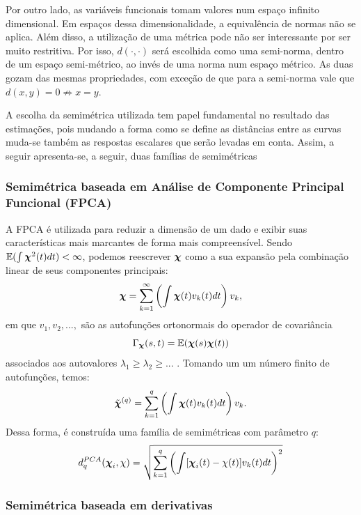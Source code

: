 \documentclass[
	12pt,				%
	openright,			%
	oneside,			%
	a4paper,			%
	english,			%
	brazil				%
	]{dissertacao-ufrgs-abntex2}
\begin{document}
Por outro lado, as variáveis funcionais tomam valores num espaço infinito
dimensional. Em espaços dessa dimensionalidade, a equivalência de normas não se
aplica. Além disso, a utilização de uma métrica pode não ser interessante
por ser muito restritiva. Por isso, $d(\cdot,\cdot)$ será escolhida como
uma semi-norma, dentro de um espaço semi-métrico, ao invés de uma
norma num espaço métrico. As duas gozam das mesmas propriedades, com
exceção de que para a semi-norma vale que $d(x,y)=0\nRightarrow x=y$. 

A escolha da semimétrica utilizada tem papel fundamental no resultado das estimações, pois mudando a forma como se define as distâncias entre as curvas muda-se também as respostas escalares que serão levadas em conta. Assim, a seguir apresenta-se, a seguir, duas famílias de semimétricas

\subsubsection{Semimétrica baseada em Análise de Componente Principal Funcional
(FPCA)}

A FPCA é utilizada para reduzir a dimensão de um dado e exibir suas
características mais marcantes de forma mais compreensível. Sendo
$\mathbb{E}(\int\boldsymbol{\chi}^{2}(t)dt)<\infty$, podemos reescrever $\boldsymbol{\chi}$
como a sua expansão pela combinação linear de seus componentes principais:
\begin{equation}
\boldsymbol{\chi}=\sum_{k=1}^{\text{\ensuremath{\infty}}}\left(\int\boldsymbol{\chi}(t)v_{k}(t)dt\right)v_{k},
\end{equation}
em que $v_{1},v_{2},...,$ são as autofunções ortonormais do operador de covariância
\begin{equation}
\Gamma_{\boldsymbol{\chi}}(s,t)=\mathbb{E}(\boldsymbol{\chi}(s)\boldsymbol{\chi}(t))
\end{equation}
associados aos autovalores $\lambda_{1}\geq\lambda_{2}\geq...$ .
Tomando um um número finito de autofunções, temos:
\begin{equation}
\tilde{\boldsymbol{\chi}}^{(q)}=\sum_{k=1}^{\text{\ensuremath{q}}}\left(\int\boldsymbol{\chi}(t)v_{k}(t)dt\right)v_{k}.
\end{equation}
Dessa forma, é construída uma família de semimétricas com parâmetro
$q$:
\begin{equation}
d_{q}^{PCA}(\boldsymbol{\chi}_{i},\chi)=\sqrt{\sum_{k=1}^{\text{\ensuremath{q}}}\left(\int[\boldsymbol{\chi}_{i}(t)-\chi(t)]v_{k}(t)dt\right)^{2}}
\end{equation}



\subsubsection{Semimétrica baseada em derivativas}
\end{document}
